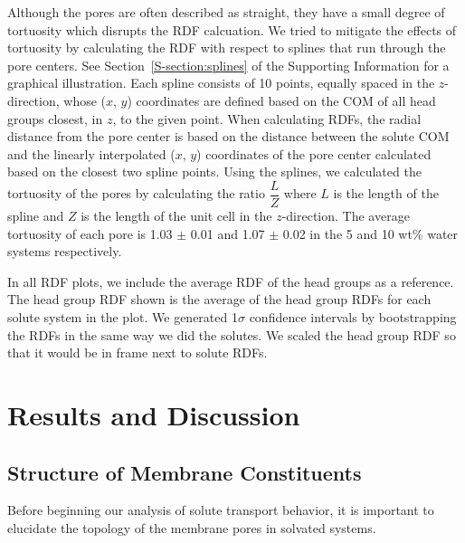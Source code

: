 \documentclass[journal=jpcbfk,manuscript=article]{achemso}
\begin{document}
  Although the pores are often described as straight, they have a
  small degree of tortuosity which disrupts the RDF calcuation. We 
  tried to mitigate the effects of tortuosity by calculating the RDF
  with respect to splines that run through the pore centers. See
  Section~\ref{S-section:splines} of the Supporting Information for 
  a graphical illustration. Each spline consists of 10 points, equally
  spaced in the $z$-direction, whose ($x$, $y$) coordinates are defined
  based on the COM of all head groups closest, in $z$, to the
  given point. When calculating RDFs, the radial distance from the pore 
  center is based on the distance between the solute COM and
  the linearly interpolated ($x$, $y$) coordinates of the pore center 
  calculated based on the closest two spline points. Using the splines, 
  we calculated the tortuosity of the pores by calculating the ratio 
  $\dfrac{L}{Z}$ where $L$ is the length of the spline and $Z$ is the 
  length of the unit cell in the $z$-direction. The average tortuosity
  of each pore is 1.03 $\pm$ 0.01 and 1.07 $\pm$ 0.02 in the 5 and 10 wt\%
  water systems respectively.
  
  In all RDF plots, we include the average RDF of the head groups as a 
  reference. The head group RDF shown is the average of the head group
  RDFs for each solute system in the plot. We generated 1$\sigma$ 
  confidence intervals by bootstrapping the RDFs in the same way we did
  the solutes. We scaled the head group RDF so that it would be in frame
  next to solute RDFs.

   
  \section{Results and Discussion}
  
  \subsection{Structure of Membrane Constituents}\label{section:membrane_components} 
  
  Before beginning our analysis of solute transport behavior, it is important to
  elucidate the topology of the membrane pores in solvated systems.  
  
\end{document}
